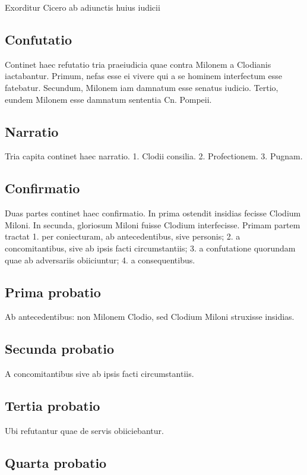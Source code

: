 Exorditur Cicero ab adiunctis huius iudicii

\subsection*{Confutatio}

Continet haec refutatio tria praeiudicia quae contra Milonem a Clodianis iactabantur. Primum, nefas esse ei vivere qui a se hominem interfectum esse fatebatur. Secundum, Milonem iam damnatum esse senatus iudicio. Tertio, eundem Milonem esse damnatum sententia Cn. Pompeii.

\subsection*{Narratio}

Tria capita continet haec narratio. 1. Clodii consilia. 2. Profectionem. 3. Pugnam.

\subsection*{Confirmatio}

Duas partes continet haec confirmatio. In prima ostendit insidias fecisse Clodium Miloni. In secunda, gloriosum Miloni fuisse Clodium interfecisse. Primam partem tractat 1. per coniecturam, ab antecedentibus, sive personis; 2. a concomitantibus, sive ab ipsis facti circumstantiis; 3. a confutatione quorundam quae ab adversariis obiiciuntur; 4. a consequentibus.

\subsection*{Prima probatio}

Ab antecedentibus: non Milonem Clodio, sed Clodium Miloni struxisse insidias.

\subsection*{Secunda probatio}

A concomitantibus sive ab ipsis facti circumstantiis.

\subsection*{Tertia probatio}

Ubi refutantur quae de servis obiiciebantur.

\subsection*{Quarta probatio}

